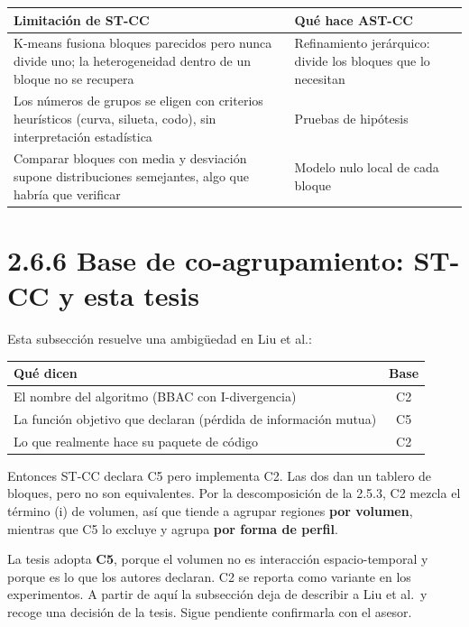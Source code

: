 \documentclass[11pt,a4paper]{article}
\begin{document}
\begin{center}
\renewcommand{\arraystretch}{1.3}
\begin{tabular}{@{}>{\raggedright\arraybackslash}p{6.6cm}>{\raggedright\arraybackslash}p{6.4cm}@{}}
\toprule
\textbf{Limitación de ST-CC} & \textbf{Qué hace AST-CC} \\
\midrule
K-means fusiona bloques parecidos pero nunca divide uno; la heterogeneidad dentro de un bloque no se recupera & Refinamiento jerárquico: divide los bloques que lo necesitan \\
\midrule
Los números de grupos se eligen con criterios heurísticos (curva, silueta, codo), sin interpretación estadística & Pruebas de hipótesis \\
\midrule
Comparar bloques con media y desviación supone distribuciones semejantes, algo que habría que verificar & Modelo nulo local de cada bloque \\
\bottomrule
\end{tabular}
\end{center}

\section{2.6.6 Base de co-agrupamiento: ST-CC y esta tesis}

Esta subsección resuelve una ambigüedad en Liu et al.:
\begin{center}
\renewcommand{\arraystretch}{1.3}
\begin{tabular}{@{}>{\raggedright\arraybackslash}p{7.2cm}c@{}}
\toprule
\textbf{Qué dicen} & \textbf{Base} \\
\midrule
El nombre del algoritmo (BBAC con I-divergencia) & C2 \\
\midrule
La función objetivo que declaran (pérdida de información mutua) & C5 \\
\midrule
Lo que realmente hace su paquete de código & C2 \\
\bottomrule
\end{tabular}
\end{center}
Entonces ST-CC declara C5 pero implementa C2. Las dos dan un tablero de bloques,
pero no son equivalentes. Por la descomposición de la 2.5.3, C2 mezcla el término
(i) de volumen, así que tiende a agrupar regiones \textbf{por volumen}, mientras
que C5 lo excluye y agrupa \textbf{por forma de perfil}.

La tesis adopta \textbf{C5}, porque el volumen no es interacción espacio-temporal
y porque es lo que los autores declaran. C2 se reporta como variante en los
experimentos. A partir de aquí la subsección deja de describir a Liu et al.\ y
recoge una decisión de la tesis. Sigue pendiente confirmarla con el asesor.
\end{document}

